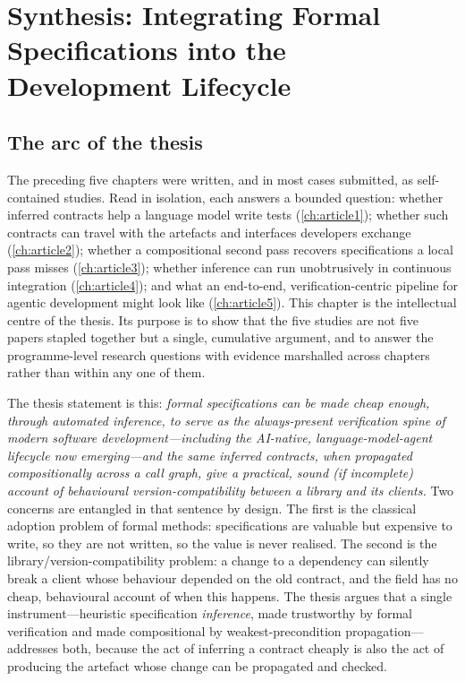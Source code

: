 \chapter{Synthesis: Integrating Formal Specifications into the Development Lifecycle}\label{ch:synthesis}

\section{The arc of the thesis}

The preceding five chapters were written, and in most cases submitted, as
self-contained studies. Read in isolation, each answers a bounded question:
whether inferred contracts help a language model write tests
(\cref{ch:article1}); whether such contracts can travel with the artefacts and
interfaces developers exchange (\cref{ch:article2}); whether a compositional
second pass recovers specifications a local pass misses (\cref{ch:article3});
whether inference can run unobtrusively in continuous integration
(\cref{ch:article4}); and what an end-to-end, verification-centric pipeline for
agentic development might look like (\cref{ch:article5}). This chapter is the
intellectual centre of the thesis. Its purpose is to show that the five studies
are not five papers stapled together but a single, cumulative argument, and to
answer the programme-level research questions with evidence marshalled across
chapters rather than within any one of them.

The thesis statement is this: \emph{formal specifications can be made cheap
enough, through automated inference, to serve as the always-present verification
spine of modern software development---including the AI-native, language-model-agent
lifecycle now emerging---and the same inferred contracts, when propagated
compositionally across a call graph, give a practical, sound (if incomplete)
account of behavioural version-compatibility between a library and its clients.}
Two concerns are entangled in that sentence by design. The first is the
classical adoption problem of formal methods: specifications are valuable but
expensive to write, so they are not written, so the value is never realised. The
second is the library/version-compatibility problem: a change to a dependency can
silently break a client whose behaviour depended on the old contract, and the
field has no cheap, behavioural account of when this happens. The thesis argues
that a single instrument---heuristic specification \emph{inference}, made
trustworthy by formal verification and made compositional by
weakest-precondition propagation---addresses both, because the act of inferring a
contract cheaply is also the act of producing the artefact whose change can be
propagated and checked.

